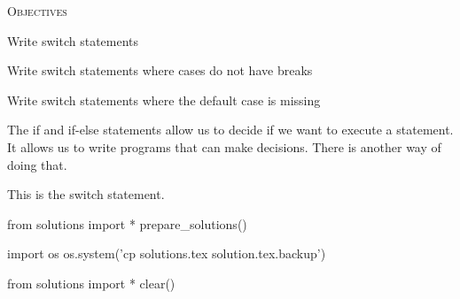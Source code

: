 
\textsc{Objectives}

\begin{tightlist}
\item
  Write switch statements
\item
  Write switch statements where cases do not have breaks
\item
  Write switch statements where the default case is missing
\end{tightlist}

The if and if-else statements allow us to decide if we want to execute a
statement. It allows us to write programs that can make decisions. There
is another way of doing that.

This is the switch statement.










\begin{python0}
from solutions import *
prepare_solutions()
\end{python0}
\begin{python}
import os
os.system('cp solutions.tex solution.tex.backup')  
\end{python}

\begin{python0}
from solutions import *
clear()
\end{python0}
